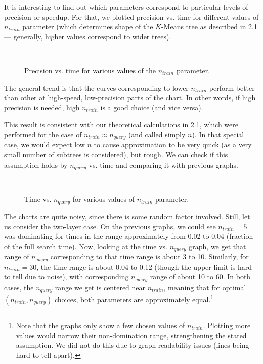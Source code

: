 It is interesting to find out which parameters correspond to particular levels
of precision or speedup. For that, we plotted precision vs. time for different
values of $n_{train}$ parameter (which determines shape of the $K$-Means tree as
described in  2.1 --- generally, higher values correspond to wider
trees).


\begin{figure}
	\centering
	\\
	\caption{Precision vs. time for various values of the $n_{train}$ parameter.}
\end{figure}

The general trend is that the curves corresponding to lower $n_{train}$ perform
better than other at high-speed, low-precision parts of the chart. In other
words, if high precision is needed, high $n_{train}$ is a good choice (and vice
versa).

This result is consistent with our theoretical calculations in  2.1, which
were performed for the case of $n_{train} \approx n_{query}$ (and called simply $n$).
In that special case, we would expect low $n$ to cause approximation to be very
quick (as a very small number of subtrees is considered), but rough. We can
check if this assumption holds by  $n_{query}$ vs. time and comparing
it with previous graphs.

\begin{figure}
	\centering
	\\
	\caption{Time vs. $n_{query}$ for various values of $n_{train}$ parameter.}
\end{figure}

The charts are quite noisy, since there is some random factor involved. Still,
let us consider the two-layer case. On the previous graphs, we could see 
$n_{train} = 5$ was dominating for times in the range approximately from 0.02 to 
0.04 (fraction of the full search time). Now, looking at the time vs. $n_{query}$ graph,
we get that range of $n_{query}$ corresponding to that time range is about
3 to 10. Similarly, for $n_{train} = 30$, the time range is about 0.04 to 0.12
(though the upper limit is hard to tell due to noise), with corresponding
$n_{query}$ range of about 10 to 60. In both cases, the $n_{query}$ range we
get is centered near $n_{train}$, meaning that for optimal 
$(n_{train}, n_{query})$ choices, both parameters are approximately 
equal.\footnote{
Note that the graphs only show a few chosen values of $n_{train}$. Plotting
more values would narrow their non-domination range, strengthening the 
stated assumption. We did not do this due to graph readability issues
(lines being hard to tell apart).
}
